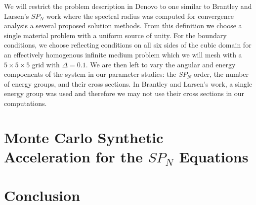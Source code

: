 \documentclass[letterpaper,12pt]{article}
\begin{document}
We will restrict the problem description in Denovo to one similar to
Brantley and Larsen's $SP_N$ work where the spectral radius was
computed for convergence analysis a several proposed solution
methods. From this definition we choose a single material problem with
a uniform source of unity. For the boundary conditions, we choose
reflecting conditions on all six sides of the cubic domain for an
effectively homogenous infinite medium problem which we will mesh with
a $5\times 5\times 5$ grid with $\Delta=0.1$. We are then left to vary
the angular and energy compoenents of the system in our parameter
studies: the $SP_N$ order, the number of energy groups, and their
cross sections. In Brantley and Larsen's work, a single energy group
was used and therefore we may not use their cross sections in our
computations.

\section{Monte Carlo Synthetic Acceleration for the $SP_N$ Equations}
\label{sec:monte_carlo}

\section{Conclusion}
\label{sec:conclusion}

\pagebreak
 

\end{document}
